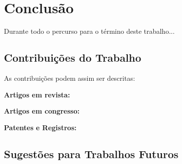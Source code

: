 
\chapter{Conclusão} %
\label{chap:canclusao} %


Durante todo o percurso para o término deste trabalho... 

\section{Contribuições do Trabalho}
As contribuições podem assim ser descritas:


\textbf{Artigos em revista:}

\textbf{Artigos em congresso:}

\textbf{Patentes e Registros:}

\section{Sugestões para Trabalhos Futuros}







